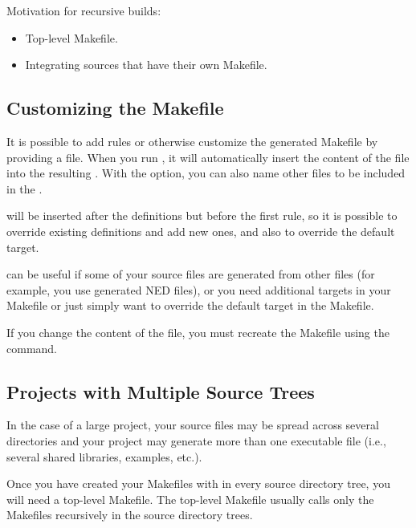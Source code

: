 Motivation for recursive builds:
\begin{itemize}
 \item Top-level Makefile.
 \item Integrating sources that have their own Makefile.
\end{itemize}


\subsection{Customizing the Makefile}
\label{sec:makefrag}

It is possible to add rules or otherwise customize the generated Makefile
by providing a  file. When you run , it
will automatically insert the content of the  file into the
resulting . With the  option, you can also name other
files to be included in the .

 will be inserted after the definitions but before the first
rule, so it is possible to override existing definitions and add new
ones, and also to override the default target.

 can be useful if some of your source files are generated
from other files (for example, you use generated NED files), or you need
additional targets in your Makefile or just simply want to override the
default target in the Makefile.

\begin{note}
If you change the content of the  file, you must recreate the
Makefile using the  command.
\end{note}

\subsection{Projects with Multiple Source Trees}
\label{sec:build-sim-progs:projects-with-multiple-source-trees}

In the case of a large project, your source files may be spread across
several directories and your project may generate more than one executable
file (i.e., several shared libraries, examples, etc.).

Once you have created your Makefiles with  in
every source directory tree, you will need a top-level Makefile.
The top-level Makefile usually calls only the Makefiles
recursively in the source directory trees.



